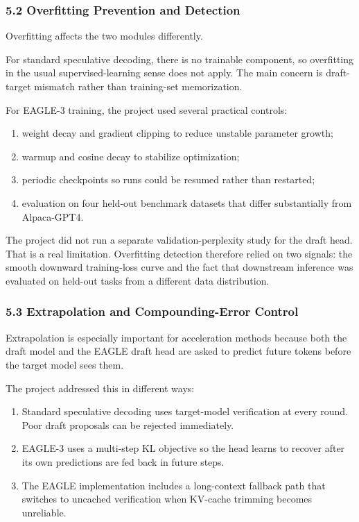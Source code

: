 \documentclass[
]{article}
\begin{document}
\subsubsection{5.2 Overfitting Prevention and
Detection}\label{52-overfitting-prevention-and-detection}

Overfitting affects the two modules differently.

For standard speculative decoding, there is no trainable component, so
overfitting in the usual supervised-learning sense does not apply. The
main concern is draft-target mismatch rather than training-set
memorization.

For EAGLE-3 training, the project used several practical controls:

\begin{enumerate}
\def\labelenumi{\arabic{enumi}.}
\item
  weight decay and gradient clipping to reduce unstable parameter
  growth;
\item
  warmup and cosine decay to stabilize optimization;
\item
  periodic checkpoints so runs could be resumed rather than restarted;
\item
  evaluation on four held-out benchmark datasets that differ
  substantially from Alpaca-GPT4.
\end{enumerate}

The project did not run a separate validation-perplexity study for the
draft head. That is a real limitation. Overfitting detection therefore
relied on two signals: the smooth downward training-loss curve and the
fact that downstream inference was evaluated on held-out tasks from a
different data distribution.

\subsubsection{5.3 Extrapolation and Compounding-Error
Control}\label{53-extrapolation-and-compounding-error-control}

Extrapolation is especially important for acceleration methods because
both the draft model and the EAGLE draft head are asked to predict
future tokens before the target model sees them.

The project addressed this in different ways:

\begin{enumerate}
\def\labelenumi{\arabic{enumi}.}
\item
  Standard speculative decoding uses target-model verification at every
  round. Poor draft proposals can be rejected immediately.
\item
  EAGLE-3 uses a multi-step KL objective so the head learns to recover
  after its own predictions are fed back in future steps.
\item
  The EAGLE implementation includes a long-context fallback path that
  switches to uncached verification when KV-cache trimming becomes
  unreliable.
\end{enumerate}
\end{document}
